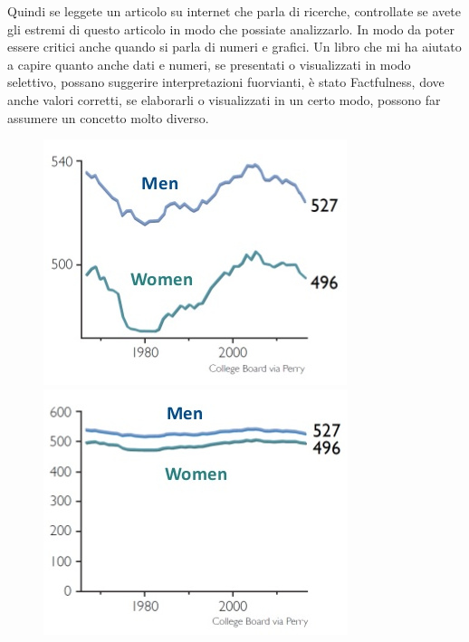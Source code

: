 \documentclass[12pt]{book} %
\begin{document}
Quindi se leggete un articolo su internet che parla di ricerche, controllate se avete gli estremi di questo articolo in
modo che possiate analizzarlo. In modo da poter essere critici anche quando si parla di numeri e grafici. Un libro che mi ha aiutato a capire quanto anche dati e numeri, se presentati o visualizzati in modo selettivo, possano suggerire interpretazioni fuorvianti, è stato Factfulness, dove anche
valori corretti, se elaborarli o visualizzati in un certo modo, possono far assumere un concetto molto diverso.

\needspace{4cm}
\begin{figure}[H]
    \begin{minipage}{0.3\textwidth}
        \centering
        \includegraphics[width=\linewidth]{images/Libro-img003.jpg}
    \end{minipage}
    \hfill
    \begin{minipage}{0.3\textwidth}
        \centering
        \includegraphics[width=\linewidth]{images/Libro-img005.jpg}

\end{minipage}
\end{figure}
\end{document}
